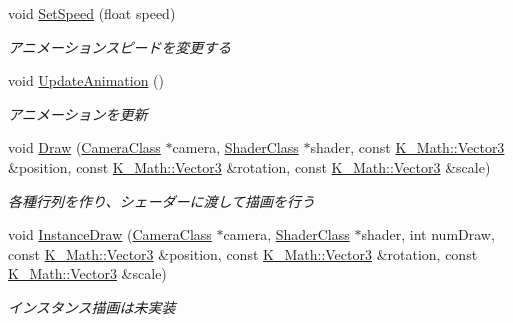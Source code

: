 \begin{DoxyCompactItemize}
void \mbox{\hyperlink{class_k___graphics_1_1_mesh_object_ad45fbf9cf32b22335eeb994bfe3e1041}{Set\+Speed}} (float speed)
\begin{DoxyCompactList}\small\item\em アニメーションスピードを変更する \end{DoxyCompactList}\item 
void \mbox{\hyperlink{class_k___graphics_1_1_mesh_object_a0e4446fa8a0b979d488210bca87df41a}{Update\+Animation}} ()
\begin{DoxyCompactList}\small\item\em アニメーションを更新 \end{DoxyCompactList}\item 
void \mbox{\hyperlink{class_k___graphics_1_1_mesh_object_a86437d928a10a4ceaa0ccdb1ed174028}{Draw}} (\mbox{\hyperlink{class_k___graphics_1_1_camera_class}{Camera\+Class}} $\ast$camera, \mbox{\hyperlink{class_k___graphics_1_1_shader_class}{Shader\+Class}} $\ast$shader, const \mbox{\hyperlink{namespace_k___math_a66884d78082c39ada4091c211f3570f8}{K\+\_\+\+Math\+::\+Vector3}} \&position, const \mbox{\hyperlink{namespace_k___math_a66884d78082c39ada4091c211f3570f8}{K\+\_\+\+Math\+::\+Vector3}} \&rotation, const \mbox{\hyperlink{namespace_k___math_a66884d78082c39ada4091c211f3570f8}{K\+\_\+\+Math\+::\+Vector3}} \&scale)
\begin{DoxyCompactList}\small\item\em 各種行列を作り、シェーダーに渡して描画を行う \end{DoxyCompactList}\item 
void \mbox{\hyperlink{class_k___graphics_1_1_mesh_object_a049000c7a45b4119fa4523ad1705bb9a}{Instance\+Draw}} (\mbox{\hyperlink{class_k___graphics_1_1_camera_class}{Camera\+Class}} $\ast$camera, \mbox{\hyperlink{class_k___graphics_1_1_shader_class}{Shader\+Class}} $\ast$shader, int num\+Draw, const \mbox{\hyperlink{namespace_k___math_a66884d78082c39ada4091c211f3570f8}{K\+\_\+\+Math\+::\+Vector3}} \&position, const \mbox{\hyperlink{namespace_k___math_a66884d78082c39ada4091c211f3570f8}{K\+\_\+\+Math\+::\+Vector3}} \&rotation, const \mbox{\hyperlink{namespace_k___math_a66884d78082c39ada4091c211f3570f8}{K\+\_\+\+Math\+::\+Vector3}} \&scale)
\begin{DoxyCompactList}\small\item\em インスタンス描画は未実装 \end{DoxyCompactList}\end{DoxyCompactItemize}
